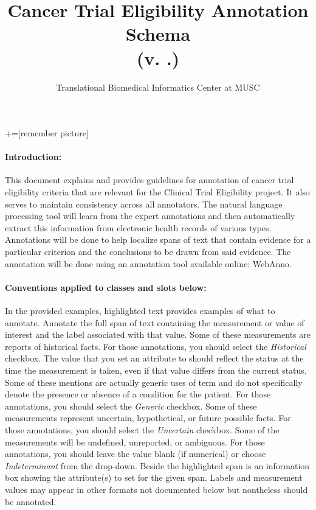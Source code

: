 \documentclass[letterpaper]{article}
\title{Cancer Trial Eligibility Annotation Schema\\(v. \themajornumber.\theminornumber)}
\author{Translational Biomedical Informatics Center at MUSC}
\begin{document}
+=[remember picture]
\def\x{0}

\maketitle

\paragraph{Introduction:}
This document explains and provides guidelines for annotation of cancer trial eligibility criteria that are relevant for the Clinical Trial Eligibility project. 
It also serves to maintain consistency across all annotators. 
The natural language processing tool will learn from the expert annotations and then automatically extract this information from electronic health records of various types.
Annotations will be done to help localize spans of text that contain evidence for a particular criterion and the conclusions to be drawn from said evidence.
The annotation will be done using an annotation tool available online: WebAnno. 

\paragraph{Conventions applied to classes and slots below:}
In the provided examples, highlighted text provides examples of what to annotate.
Annotate the full span of text containing the measurement or value of interest and the label associated with that value.
Some of these measurements are reports of historical facts.
For those annotations, you should select the \textsl{Historical} checkbox.
The value that you set an attribute to should reflect the status at the time the measurement is taken, even if that value differs from the current status.
Some of these mentions are actually generic uses of term and do not specifically denote the presence or absence of a condition for the patient.
For those annotations, you should select the \textsl{Generic} checkbox.
Some of these measurements represent uncertain, hypothetical, or future possible facts.
For those annotations, you should select the \textsl{Uncertain} checkbox.
Some of the measurements will be undefined, unreported, or ambiguous.
For those annotations, you should leave the value blank (if numerical) or choose \textsl{Indeterminant} from the drop-down.
Beside the highlighted span is an information box showing the attribute(s) to set for the given span.
Labels and measurement values may appear in other formats not documented below but nontheless should be annotated.
\end{document}
